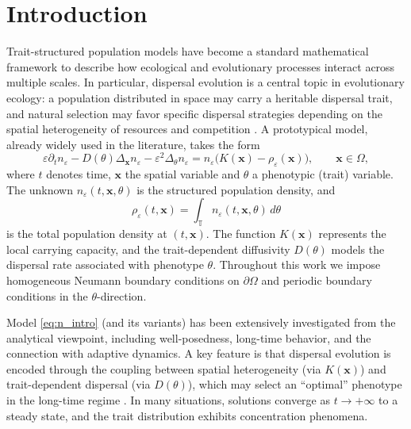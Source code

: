 \documentclass[11pt, dina4, amsfont12]{article}
\begin{document}






\section{Introduction}

Trait-structured population models have become a standard mathematical framework
to describe how ecological and evolutionary processes interact across multiple
scales. In particular, dispersal evolution is a central topic in evolutionary
ecology: a population distributed in space may carry a heritable dispersal trait,
and natural selection may favor specific dispersal strategies depending on the
spatial heterogeneity of resources and competition \cite{CantrellCosnerBook,PerthameBook}.
A prototypical model, already widely used in the literature, takes the form
\begin{equation}\label{eq:n_intro}
    \varepsilon \partial_t n_\varepsilon
    -D(\theta)\Delta_\mathbf{x} n_\varepsilon
    -\varepsilon^2\Delta_\theta n_\varepsilon
    =
    n_\varepsilon\bigl(K(\mathbf{x})-\rho_\varepsilon(\mathbf{x})\bigr),
    \qquad \mathbf{x}\in\Omega,
\end{equation}
where $t$ denotes time, $\mathbf{x}$ the spatial variable and $\theta$ a phenotypic
(trait) variable. The unknown $n_\varepsilon(t,\mathbf{x},\theta)$ is the structured
population density, and
\[
\rho_\varepsilon(t,\mathbf{x})
=
\int_{\mathbb T} n_\varepsilon(t,\mathbf{x},\theta)\,d\theta
\]
is the total population density at $(t,\mathbf{x})$. The function $K(\mathbf{x})$
represents the local carrying capacity, and the trait-dependent diffusivity
$D(\theta)$ models the dispersal rate associated with phenotype $\theta$.
Throughout this work we impose homogeneous Neumann boundary conditions on
$\partial\Omega$ and periodic boundary conditions in the $\theta$-direction.

Model \eqref{eq:n_intro} (and its variants) has been extensively investigated from
the analytical viewpoint, including well-posedness, long-time behavior, and the
connection with adaptive dynamics. A key feature is that dispersal evolution is
encoded through the coupling between spatial heterogeneity (via $K(\mathbf{x})$)
and trait-dependent dispersal (via $D(\theta)$), which may select an ``optimal''
phenotype in the long-time regime \cite{MirrahimiPerthame,PerthameSouganidis,AlmeidaPerthameRuan}.
In many situations, solutions converge as $t\to+\infty$ to a steady state, and the
trait distribution exhibits concentration phenomena.
\end{document}
